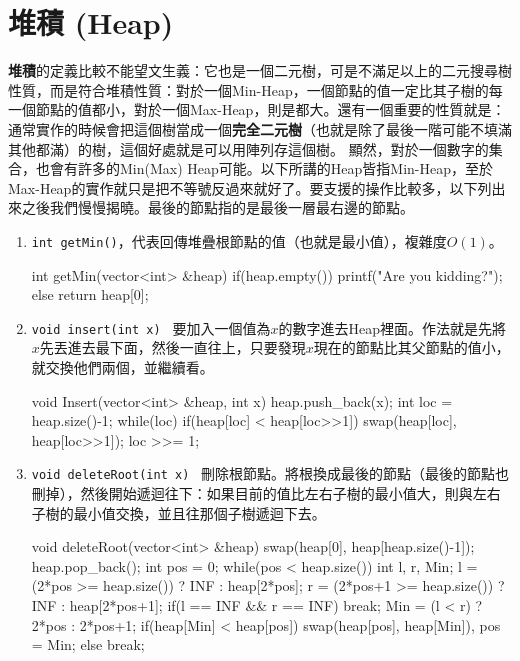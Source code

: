 \documentclass[main.tex]{subfiles}
\begin{document}
\section{堆積 (Heap)}
\textbf{堆積}的定義比較不能望文生義：它也是一個二元樹，可是不滿足以上的二元搜尋樹性質，而是符合堆積性質：對於一個Min-Heap，一個節點的值一定比其子樹的每一個節點的值都小，對於一個Max-Heap，則是都大。還有一個重要的性質就是：通常實作的時候會把這個樹當成一個\textbf{完全二元樹}（也就是除了最後一階可能不填滿其他都滿）的樹，這個好處就是可以用陣列存這個樹。
顯然，對於一個數字的集合，也會有許多的Min(Max) Heap可能。以下所講的Heap皆指Min-Heap，至於Max-Heap的實作就只是把不等號反過來就好了。要支援的操作比較多，以下列出來之後我們慢慢揭曉。最後的節點指的是最後一層最右邊的節點。
\begin{enumerate}
\item \texttt{int getMin()}，代表回傳堆疊根節點的值（也就是最小值），複雜度$O(1)$。
\begin{C++}
int getMin(vector<int> &heap) {
    if(heap.empty())
        printf("Are you kidding?\n");
    else return heap[0];
}
\end{C++}
\item \texttt{void insert(int x) } 要加入一個值為$x$的數字進去Heap裡面。作法就是先將$x$先丟進去最下面，然後一直往上，只要發現$x$現在的節點比其父節點的值小，就交換他們兩個，並繼續看。
\begin{C++}
void Insert(vector<int> &heap, int x) {
    heap.push_back(x);
    int loc = heap.size()-1;
    while(loc){
        if(heap[loc] < heap[loc>>1])
            swap(heap[loc], heap[loc>>1]);
        loc >>= 1;
    }
}
\end{C++}
\item \texttt{void deleteRoot(int x) } 刪除根節點。將根換成最後的節點（最後的節點也刪掉），然後開始遞迴往下：如果目前的值比左右子樹的最小值大，則與左右子樹的最小值交換，並且往那個子樹遞迴下去。
\begin{C++}
void deleteRoot(vector<int> &heap) {
    swap(heap[0], heap[heap.size()-1]);
    heap.pop_back();
    int pos = 0;
    while(pos < heap.size()) {
        int l, r, Min;
        l = (2*pos >= heap.size()) ?
        	INF : heap[2*pos];
        r = (2*pos+1 >= heap.size()) ?
        	INF : heap[2*pos+1];
        if(l == INF && r == INF) break;
        Min = (l < r) ? 2*pos : 2*pos+1;
        if(heap[Min] < heap[pos])
            swap(heap[pos], heap[Min]), pos = Min;
        else break;
    }
}
\end{C++}
\end{enumerate}
\end{document}
